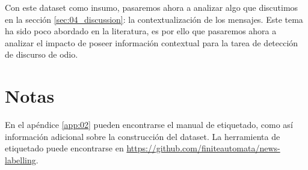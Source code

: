 Con este dataset como insumo, pasaremos ahora a analizar algo que discutimos en la sección \ref{sec:04_discussion}: la contextualización de los mensajes. Este tema ha sido poco abordado en la literatura, es por ello que pasaremos ahora a analizar el impacto de poseer información contextual para la tarea de detección de discurso de odio.

\section{Notas}


En el apéndice \ref{app:02} pueden encontrarse el manual de etiquetado, como así información adicional sobre la construcción del dataset. La herramienta de etiquetado puede encontrarse en \url{https://github.com/finiteautomata/news-labelling}.
